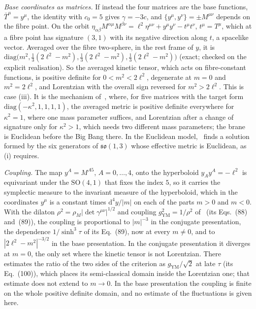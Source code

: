 \emph{Base coordinates as matrices.} If instead the four matrices are the base functions, \(\bar T^\mu=y^\mu\), the identity with \(c_0=5\) gives \(\gamma=-3c\), and \(\{y^\mu,y^\nu\}=\pm M^{\mu\nu}\) depends on the fibre point. On the orbit \(\eta_{\alpha\beta}M^{\alpha\mu}M^{\beta\nu}=\ell^2\eta^{\mu\nu}+y^\mu y^\nu-t^\mu t^\nu\), \(t^\mu=T^\mu\), which at a fibre point has signature \((3,1)\) with its negative direction along \(t\), a spacelike vector. Averaged over the fibre two-sphere, in the rest frame of \(y\), it is \(\mathrm{diag}\bigl(m^2,\tfrac13(2\ell^2-m^2),\tfrac13(2\ell^2-m^2),\tfrac13(2\ell^2-m^2)\bigr)\) (exact; checked on the explicit realisation). So the averaged kinetic tensor, which acts on fibre-constant functions, is positive definite for \(0<m^2<2\ell^2\), degenerate at \(m=0\) and \(m^2=2\ell^2\), and Lorentzian with the overall sign reversed for \(m^2>2\ell^2\). This is case (iii). It is the mechanism of~\cite{Steinacker2018BB}, where, for five matrices with the target form \(\mathrm{diag}(-\kappa^2,1,1,1,1)\), the averaged metric is positive definite everywhere for \(\kappa^2=1\), where one mass parameter suffices, and Lorentzian after a change of signature only for \(\kappa^2>1\), which needs two different mass parameters; the brane is Euclidean before the Big Bang there. In the Euclidean model,~\cite{LiaoMaeta2025} finds a solution formed by the six generators of \(\mathfrak{so}(1,3)\) whose effective metric is Euclidean, as (i) requires.

\emph{Coupling.} The map \(y^A=M^{A5}\), \(A=0,\dots,4\), onto the hyperboloid \(y_Ay^A=-\ell^2\) is equivariant under the \(\mathrm{SO}(4,1)\) that fixes the index \(5\), so it carries the symplectic measure to the invariant measure of the hyperboloid, which in the coordinates \(y^\mu\) is a constant times \(\mathrm d^4y/|m|\) on each of the parts \(m>0\) and \(m<0\). With the dilaton \(\rho^2=\rho_M|\det\gamma^{\mu\nu}|^{1/2}\) and coupling \(g_{\mathrm{YM}}^2=1/\rho^2\) of~\cite{Steinacker2026Weak} (its Eqs.~(88) and~(89)), the coupling is proportional to \(|m|^{-3}\) in the conjugate presentation, the dependence \(1/\sinh^3\tau\) of its Eq.~(89), now at every \(m\neq0\), and to \(|2\ell^2-m^2|^{-3/2}\) in the base presentation. In the conjugate presentation it diverges at \(m=0\), the only set where the kinetic tensor is not Lorentzian. There~\cite{Steinacker2026Weak} estimates the ratio of the two sides of the criterion as \(g_{\mathrm{YM}}/\sqrt2\) at late \(\tau\) (its Eq.~(100)), which places its semi-classical domain inside the Lorentzian one; that estimate does not extend to \(m\to0\). In the base presentation the coupling is finite on the whole positive definite domain, and no estimate of the fluctuations is given here.

